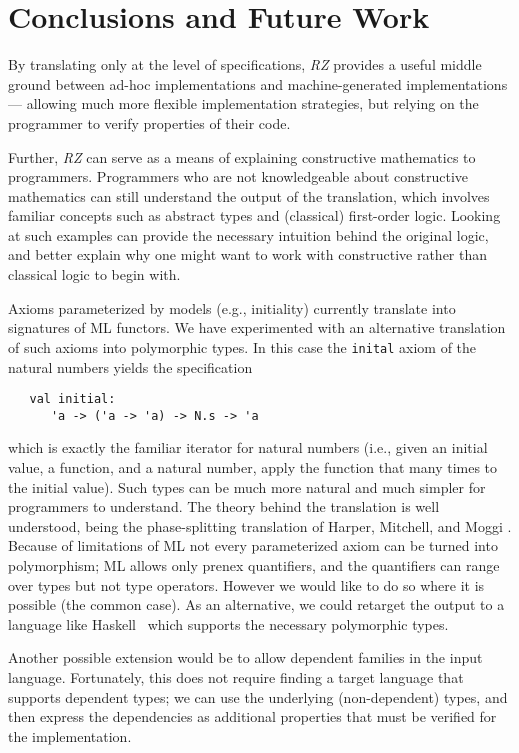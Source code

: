\section{Conclusions and Future Work}
\label{sec:conclusion}

By translating only at the level of specifications, \emph{RZ} provides a
useful middle ground between ad-hoc implementations and
machine-generated implementations --- allowing much more flexible
implementation strategies, but relying on the programmer to
verify properties of their code.

Further, \emph{RZ} can serve as a means of explaining constructive
mathematics to programmers.  Programmers who are not knowledgeable
about constructive mathematics can still understand the output of the
translation, which involves familiar concepts such as abstract types
and (classical) first-order logic.   Looking at such examples can
provide the necessary intuition behind the original logic, and better
explain why one might want to work with constructive rather than
classical logic to begin with.

\bigskip
 
Axioms parameterized by models (e.g., initiality) currently translate
into signatures of ML functors.  We have experimented with an
alternative translation of such axioms into polymorphic types.  In
this case the \Verb|inital| axiom of the natural numbers yields
the specification
\begin{Verbatim}
   val initial: 
      'a -> ('a -> 'a) -> N.s -> 'a
\end{Verbatim}
which is exactly the familiar iterator for natural numbers (i.e., given
an initial value, a function, and a natural number, apply the function 
that many times to the initial value).  
Such types can be much more natural and much simpler for
programmers to understand.  The theory behind the translation is
well understood, being the phase-splitting translation of
Harper, Mitchell, and Moggi \cite{harper+:popl90}.  Because of
limitations of ML not every parameterized axiom can be
turned into polymorphism; ML allows only prenex quantifiers, and the
quantifiers can range over types but not type operators.  However
we would like to do so where it is possible (the common
case).  As an alternative, we could retarget the output to a language
like Haskell~\cite{haskell} which supports the necessary polymorphic types.

Another possible extension would be to allow dependent families in the
input language. Fortunately, this does not require finding a target
language that supports dependent types; we can use the underlying
(non-dependent) types, and then express the dependencies as additional
properties that must be verified for the implementation.


